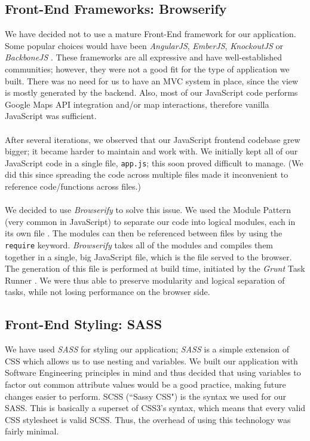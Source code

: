 \documentclass[a4paper, 10pt]{report}
\begin{document}
\subsection{Front-End Frameworks: Browserify}
We have decided not to use a mature Front-End framework for our application. Some popular choices would have been \textit{AngularJS}, \textit{EmberJS}, \textit{KnockoutJS }or \textit{BackboneJS} \cite{js-frameworks}. These frameworks are all expressive and have well-established communities; however, they were not a good fit for the type of application we built. There was no need for us to have an MVC system in place, since the view is mostly generated by the backend. Also, most of our JavaScript code performs Google Maps API integration and/or map interactions, therefore vanilla JavaScript was sufficient.\\\\
After several iterations, we observed that our JavaScript frontend codebase grew bigger; it became harder to maintain and work with. We initially kept all of our JavaScript code in a single file, \texttt{app.js}; this soon proved difficult to manage. (We did this since spreading the code across multiple files made it inconvenient to reference code/functions across files.) \\\\
We decided to use \textit{Browserify} \cite{browserify} to solve this issue. We used the Module Pattern (very common in JavaScript) to separate our code into logical modules, each in its own file \cite{module-pattern}. The modules can then be referenced between files by using the \texttt{require} keyword. \textit{Browserify} takes all of the modules and compiles them together in a single, big JavaScript file, which is the file served to the browser. The generation of this file is performed at build time, initiated by the \textit{Grunt} Task Runner \cite{grunt}. We were thus able to preserve modularity and logical separation of tasks, while not losing performance on the browser side.
\subsection{Front-End Styling: SASS}
We have used \textit{SASS} \cite{sass} for styling our application; \textit{SASS} is a simple extension of CSS which allows us to use nesting and variables. We built our application with Software Engineering principles in mind and thus decided that using variables to factor out common attribute values would be a good practice, making future changes easier to perform. SCSS (``Sassy CSS") is the syntax we used for our SASS. This is basically a superset of CSS3's syntax, which means that every valid CSS stylesheet is valid SCSS. Thus, the overhead of using this technology was fairly minimal. 
\end{document}
